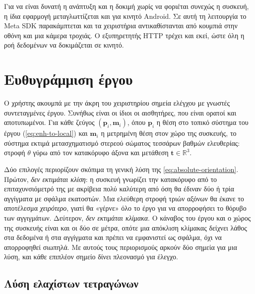 Για να είναι δυνατή η ανάπτυξη και η δοκιμή χωρίς να φοριέται συνεχώς η συσκευή, η ίδια εφαρμογή μεταγλωττίζεται και για κινητό Android. Σε αυτή τη λειτουργία το Meta SDK παρακάμπτεται και τα χειριστήρια αντικαθίστανται από κουμπιά στην οθόνη και μια κάμερα τροχιάς. Ο εξυπηρετητής HTTP τρέχει και εκεί, ώστε όλη η ροή δεδομένων να δοκιμάζεται σε κινητό.

\section{Ευθυγράμμιση έργου}
\label{sec:impl-alignment}

Ο χρήστης ακουμπά με την άκρη του χειριστηρίου σημεία ελέγχου με γνωστές συντεταγμένες έργου. Συνήθως είναι οι ίδιοι οι αισθητήρες, που είναι ορατοί και αποτυπωμένοι. Για κάθε ζεύγος $(\mathbf{p}_i, \mathbf{m}_i)$, όπου $\mathbf{p}_i$ η θέση στο τοπικό σύστημα του έργου (\cref{eq:enh-to-local}) και $\mathbf{m}_i$ η μετρημένη θέση στον χώρο της συσκευής, το σύστημα εκτιμά μετασχηματισμό στερεού σώματος τεσσάρων βαθμών ελευθερίας: στροφή $\theta$ γύρω από τον κατακόρυφο άξονα και μετάθεση $\mathbf{t} \in \mathbb{R}^3$.

Δύο επιλογές περιορίζουν σκόπιμα τη γενική λύση της \cref{eq:absolute-orientation}. Πρώτον, \emph{δεν εκτιμάται κλίση}: η συσκευή γνωρίζει την κατακόρυφο από το επιταχυνσιόμετρό της με ακρίβεια πολύ καλύτερη από όση θα έδιναν δύο ή τρία αγγίγματα με σφάλμα εκατοστών. Μια ελεύθερη στροφή τριών αξόνων θα έκανε το αποτέλεσμα \emph{χειρότερο}, γιατί θα «γέρνε» όλο το έργο για να απορροφήσει το θόρυβο των αγγιγμάτων. Δεύτερον, \emph{δεν εκτιμάται κλίμακα}. Ο κάναβος του έργου και ο χώρος της συσκευής είναι και οι δύο σε μέτρα, οπότε μια απόκλιση κλίμακας δείχνει λάθος στα δεδομένα ή στα αγγίγματα και πρέπει να εμφανιστεί ως σφάλμα, όχι να απορροφηθεί σιωπηλά. Με αυτούς τους περιορισμούς αρκούν δύο σημεία για μια λύση, και κάθε επιπλέον σημείο δίνει πλεονασμό για έλεγχο.

\subsection{Λύση ελαχίστων τετραγώνων}

